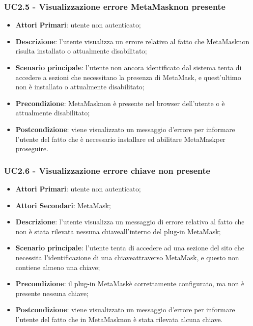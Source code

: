 \subsubsection{UC2.5 - Visualizzazione errore MetaMask\glosp non presente}
\begin{itemize}
	\item \textbf{Attori Primari}: utente non autenticato;
	\item \textbf{Descrizione}: l'utente visualizza un errore relativo al fatto che MetaMask\glosp non risulta installato o attualmente disabilitato;
	\item \textbf{Scenario principale}: l'utente non ancora identificato dal sistema tenta di accedere a sezioni che necessitano la presenza di MetaMask\glosp, e quest'ultimo non è installato o attualmente disabilitato;
	\item \textbf{Precondizione}: MetaMask\glosp non è presente nel browser dell'utente o è attualmente disabilitato;
	\item \textbf{Postcondizione}: viene visualizzato un messaggio d'errore per informare l'utente del fatto che è necessario installare ed abilitare MetaMask\glosp per proseguire.
	
\end{itemize}

\subsubsection{UC2.6 - Visualizzazione errore chiave non 
	presente}
\begin{itemize}
	\item \textbf{Attori Primari}: utente non autenticato;
	\item \textbf{Attori Secondari}: MetaMask\glo;
	\item \textbf{Descrizione}:
	l'utente visualizza un messaggio di errore relativo al fatto che non è stata rilevata nessuna chiave\glosp all'interno del plug-in MetaMask\glo;
	\item \textbf{Scenario principale}: l'utente tenta di accedere ad una sezione del sito che necessita l'identificazione di una chiave\glosp attraverso MetaMask\glo, e questo non contiene almeno una chiave\glo;
	\item \textbf{Precondizione}: il plug-in MetaMask\glosp è correttamente configurato, ma non è presente nessuna chiave\glo;
	\item \textbf{Postcondizione}: viene visualizzato un messaggio d'errore per informare l'utente del fatto che in MetaMask\glosp non è stata rilevata alcuna chiave\glo.
	
\end{itemize}




